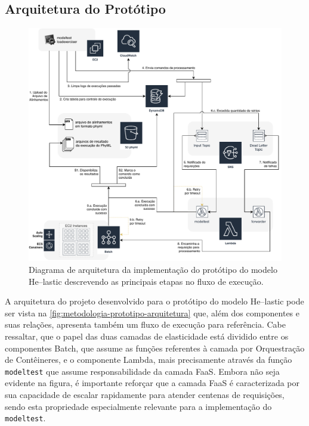 \documentclass[english,brazilian]{UNISINOSmonografia} %
\begin{document}
\subsection{Arquitetura do Protótipo}


\begin{figure}[tp]
	\centering%
	\begin{minipage}{\textwidth}
		\caption{Diagrama de arquitetura da implementação do protótipo do modelo \textsf{He}--lastic descrevendo as principais etapas no fluxo de execução.}
		\label{fig:metodologia-prototipo-arquitetura}
		\vspace{1ex}
		\includegraphics[width=\textwidth]{prototipo-arquitetura}
	\end{minipage}
\end{figure}


A arquitetura do projeto desenvolvido para o protótipo do modelo \textsf{He}--lastic pode ser vista na \autoref{fig:metodologia-prototipo-arquitetura} que, além dos componentes e suas relações, apresenta também um fluxo de execução para referência.
%
Cabe ressaltar, que o papel das duas camadas de elasticidade está dividido entre os componentes Batch, que assume as funções referentes à camada por Orquestração de Contêineres, e o componente Lambda, mais precisamente através da função \texttt{modeltest} que assume responsabilidade da camada FaaS.
%
Embora não seja evidente na figura, é importante reforçar que a camada FaaS é caracterizada por sua capacidade de escalar rapidamente para atender centenas de requisições, sendo esta propriedade especialmente relevante para a implementação do \texttt{modeltest}.
\end{document}
